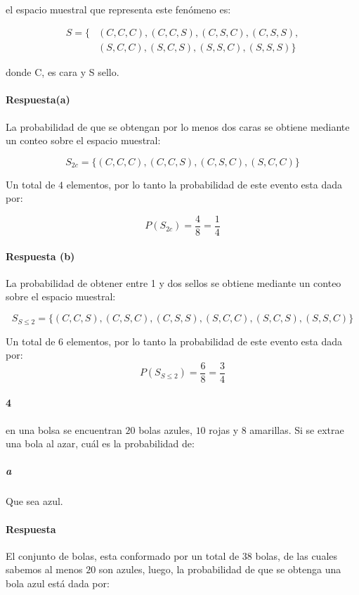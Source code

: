 \documentclass{article}
\begin{document}
\paragraph{}el espacio muestral que representa este fenómeno es:

\begin{align*}
S = \{ 
	&(C,C,C), (C,C,S), (C,S,C), (C,S,S),\\
	&(S,C,C), (S,C,S), (S,S,C), (S,S,S)
\}
\end{align*}

donde C, es cara y S sello.

\paragraph{Respuesta(a)} La probabilidad de que se obtengan por lo menos dos caras se obtiene mediante un conteo sobre el espacio muestral:

$$S_{2c} = \{(C,C,C), (C,C,S), (C,S,C), (S,C,C) \}$$

Un total de $4$ elementos, por lo tanto la probabilidad de este evento esta dada por:

$$P(S_{2c}) = \frac{4}{8} = \frac{1}{4}$$

\paragraph{Respuesta (b)} La probabilidad de obtener entre 1 y dos sellos se obtiene mediante un conteo sobre el espacio muestral:

$$S_{S\leq2} = \{ (C,C,S), (C,S,C), (C,S,S), (S,C,C), (S,C,S), (S,S,C) \}$$

Un total de $6$ elementos, por lo tanto la probabilidad de este evento esta dada por:
$$P(S_{S\leq2}) = \frac{6}{8} =\frac{3}{4}$$

\newpage

\paragraph{4} en una bolsa se encuentran $20$ bolas azules, $10$ rojas y $8$ amarillas. Si se extrae una bola al azar, cuál es la probabilidad de:

\subparagraph{a} Que sea azul.

\paragraph{Respuesta} El conjunto de bolas, esta conformado por un total de $38$ bolas, de las cuales sabemos al menos $20$ son azules, luego, la probabilidad de que se obtenga una bola azul está dada por:
\end{document}
